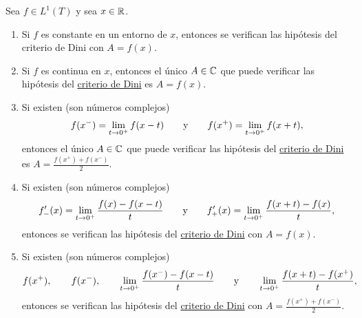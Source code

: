 \documentclass[a4paper, 11pt, oneside]{report}
\begin{document}
\begin{proposition}
  Sea $f \in L^1(T)$ y sea $x \in \mathbb R$.
  \begin{enumerate}
    \item Si $f$ es constante en un entorno de $x$, entonces se verifican las hipótesis del criterio de Dini con $A = f(x)$.
    \item Si $f$ es continua en $x$, entonces el único $A \in \mathbb C$ que puede verificar las hipótesis del \hyperref[teo:4.2.3]{\color{c1}criterio de Dini} es $A = f(x)$.
    \item Si existen (son números complejos)
    \[f(x^-) = \lim_{t \to 0^+} f(x-t) \qquad \textup{y} \qquad f(x^+) = \lim_{t \to 0^+}f(x+t),\]
    entonces el único $A \in \mathbb C$ que puede verificar las hipótesis del \hyperref[teo:4.2.3]{\color{c1}criterio de Dini} es $A = \frac{f(x^+)+f(x^-)}{2}$. 
    \item Si existen (son números complejos)
    \[f'_-(x) = \lim_{t \to 0^+} \frac{f(x)-f(x-t)}{t} \qquad \textup{y} \qquad f'_+(x) = \lim_{t \to 0^+} \frac{f(x+t) - f(x)}{t},\]
    entonces se verifican las hipótesis del \hyperref[teo:4.2.3]{\color{c1}criterio de Dini} con $A = f(x)$.
    \item Si existen (son números complejos)
    \[f(x^+), \qquad f(x^-), \qquad \lim_{t \to 0^+} \frac{f(x^-)-f(x-t)}{t} \qquad \textup{y} \qquad \lim_{t \to 0^+} \frac{f(x+t) - f(x^+)}{t},\]
    entonces se verifican las hipótesis del \hyperref[teo:4.2.3]{\color{c1}criterio de Dini} con $A = \frac{f(x^+)+f(x^-)}{2}$.
  \end{enumerate}
\end{proposition}
\end{document}
